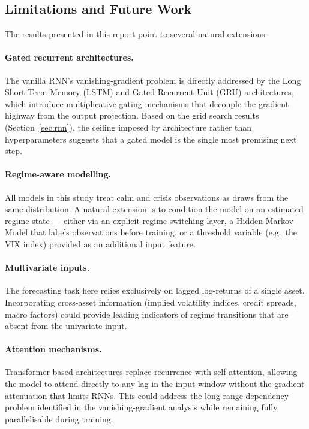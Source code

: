 \subsection{Limitations and Future Work}

The results presented in this report point to several natural extensions.

\paragraph{Gated recurrent architectures.}
The vanilla RNN's vanishing-gradient problem is directly addressed by the Long
Short-Term Memory (LSTM) and Gated Recurrent Unit (GRU) architectures, which
introduce multiplicative gating mechanisms that decouple the gradient highway
from the output projection. Based on the grid search results (Section~\ref{sec:rnn}),
the ceiling imposed by architecture rather than hyperparameters suggests that a
gated model is the single most promising next step.

\paragraph{Regime-aware modelling.}
All models in this study treat calm and crisis observations as draws from the
same distribution. A natural extension is to condition the model on an estimated
regime state --- either via an explicit regime-switching layer, a Hidden Markov
Model that labels observations before training, or a threshold variable (e.g.\
the VIX index) provided as an additional input feature.

\paragraph{Multivariate inputs.}
The forecasting task here relies exclusively on lagged log-returns of a single
asset. Incorporating cross-asset information (implied volatility indices, credit
spreads, macro factors) could provide leading indicators of regime transitions
that are absent from the univariate input.

\paragraph{Attention mechanisms.}
Transformer-based architectures replace recurrence with self-attention, allowing
the model to attend directly to any lag in the input window without the gradient
attenuation that limits RNNs. This could address the long-range dependency
problem identified in the vanishing-gradient analysis while remaining fully
parallelisable during training.
